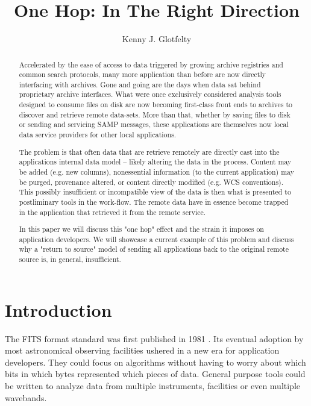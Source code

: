 
\resetcounters





\title{One Hop: In The Right Direction} \author{Kenny J. Glotfelty}

\begin{abstract}
Accelerated by the ease of access to data triggered by growing archive registries and common search protocols, many more application than before are now directly interfacing with archives.  Gone and going are the days when data sat behind proprietary archive interfaces.  What were once exclusively considered analysis tools designed to consume files on disk are now becoming first-class front ends to archives to discover and retrieve remote data-sets.  More than that, whether by saving files to disk or sending and servicing SAMP messages, these applications are themselves now local data service providers for other local applications.

The problem is that often data that are retrieve remotely are directly cast into the applications internal data model -- likely altering the data in the process.  Content may be added (e.g. new columns), nonessential information (to the current application) may be purged, provenance altered, or content directly modified (e.g. WCS conventions). This possibly insufficient or incompatible view of the  data is then what is presented to postliminary tools in the work-flow. The remote data have in essence become trapped in the application that retrieved it from the remote service.

In this paper we will discuss this "one hop" effect and the strain it imposes on application developers.  We will showcase a current example of this problem and discuss why a "return to source" model of sending all applications back to the original remote source is, in general, insufficient.
\end{abstract}

\section{Introduction}

The FITS format standard was first published in 1981 \citep{1981A&AS...44..363W}.  Its eventual adoption by most astronomical observing facilities ushered in a new era for application developers.  They could focus on algorithms without having to worry about which bits in which bytes represented which pieces of data. General purpose tools could be written to analyze data from multiple instruments, facilities or even multiple wavebands.

